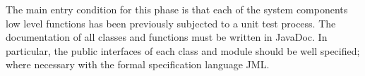
The main entry condition for this phase is that each of the system components low level functions has been previously subjected to a unit test process.
The documentation of all classes and functions must be written in JavaDoc. In particular, the public interfaces of each class and module should be well specified; where necessary with the formal specification language JML.

